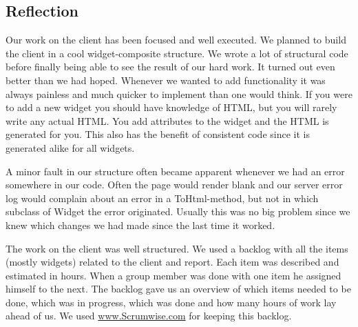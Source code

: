 \subsection{Reflection}
Our work on the client has been focused and well executed. We planned to build the client in a cool widget-composite structure. We wrote a lot of structural code before finally being able to see the result of our hard work. It turned out even better than we had hoped. Whenever we wanted to add functionality it was always painless and much quicker to implement than one would think. If you were to add a new widget you should have knowledge of HTML, but you will rarely write any actual HTML. You add attributes to the widget and the HTML is generated for you. This also has the benefit of consistent code since it is generated alike for all widgets.

A minor fault in our structure often became apparent whenever we had an error somewhere in our code. Often the page would render blank and our server error log would complain about an error in a ToHtml-method, but not in which subclass of Widget the error originated. Usually this was no big problem since we knew which changes we had made since the last time it worked.

The work on the client was well structured. We used a backlog with all the items (mostly widgets) related to the client and report. Each item was described and estimated in hours. When a group member was done with one item he assigned himself to the next. The backlog gave us an overview of which items needed to be done, which was in progress, which was done and how many hours of work lay ahead of us. We used \url{www.Scrumwise.com} for keeping this backlog.
\newpage